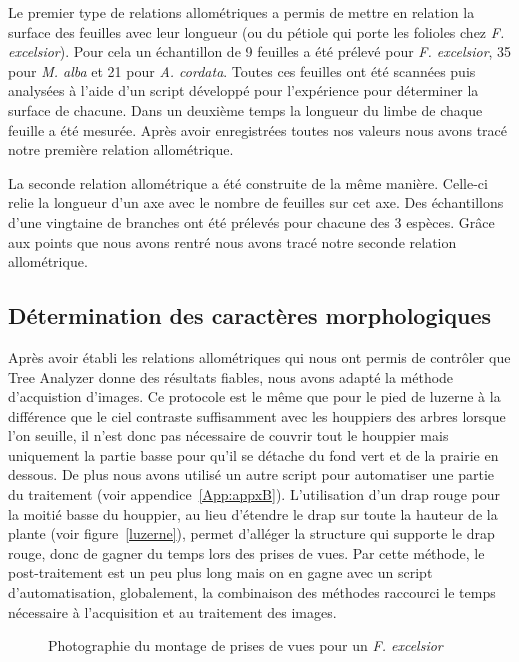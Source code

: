 ﻿\documentclass[12pt]{report}
\begin{document}
Le premier type de relations allométriques a permis de mettre en relation la surface
des feuilles avec leur longueur (ou du pétiole qui porte les
folioles chez \textit{F. excelsior}). Pour cela un échantillon de 9 feuilles a
été prélevé pour \textit{F. excelsior}, 35 pour \textit{M. alba} et 21 pour \textit{A. cordata}.
Toutes ces feuilles ont été scannées puis analysées à l'aide d'un script développé
pour l'expérience pour déterminer la surface de chacune. Dans un deuxième temps
la longueur du limbe de chaque feuille a été mesurée. Après avoir enregistrées
toutes nos valeurs nous avons tracé notre première relation allométrique.

La seconde relation allométrique a été construite de la même manière. Celle-ci relie
la longueur d'un axe avec le nombre de feuilles sur cet axe. Des échantillons d'une
vingtaine de branches ont été prélevés pour chacune des 3 espèces. Grâce aux points
que nous avons rentré nous avons tracé notre seconde relation allométrique.

\subsection{Détermination des caractères morphologiques}

Après avoir établi les relations allométriques qui nous ont permis de contrôler
que Tree Analyzer donne des résultats fiables, nous avons adapté la méthode
d'acquistion d'images. Ce protocole est le même que pour le pied de luzerne à la différence que le ciel
contraste suffisamment avec les houppiers des arbres lorsque l'on seuille, il
n'est donc pas nécessaire de couvrir tout le houppier mais uniquement la partie
basse pour qu'il se détache du fond vert et de la prairie en dessous.
De plus nous avons utilisé un autre script pour automatiser une partie
du traitement (voir appendice~\ref{App:appxB}). L'utilisation
d'un drap rouge pour la moitié basse du houppier, au lieu d'étendre le drap sur
toute la hauteur de la plante (voir figure~\ref{luzerne}), permet d'alléger
la structure qui supporte le drap rouge, donc de gagner
du temps lors des prises de vues. Par cette méthode, le post-traitement est un
peu plus long mais on en gagne avec un script d'automatisation, globalement, la
combinaison des méthodes raccourci le temps nécessaire à l'acquisition et au
traitement des images.

\begin{figure}
  \centering
  \def\svgwidth{\linewidth}
  
  \caption{Photographie du montage de prises de vues pour un \textit{F. excelsior}\label{fig:montage_finale}}
\end{figure}
\end{document}
